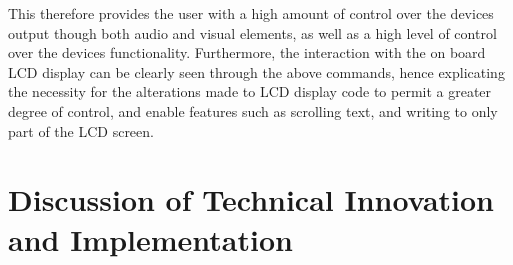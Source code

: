 \par\bigskip\noindent
This therefore provides the user with a high amount of control over the devices 
output though both audio and visual elements, as well as a high level of control 
over the devices functionality. Furthermore, the interaction with 
the on board LCD display can be clearly seen through the above commands, hence 
explicating the necessity for the alterations made to LCD display code to permit 
a greater degree of control, and enable features such as scrolling text, and 
writing to only part of the LCD screen. 

\section{Discussion of Technical Innovation and Implementation}


